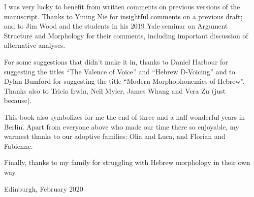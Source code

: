 I was very lucky to benefit from written comments on previous versions of the manuscript. Thanks to Yining Nie for insightful comments on a previous draft; and to Jim Wood and the students in his 2019 Yale seminar on Argument Structure and Morphology for their comments, including important discussion of alternative analyses.

For some suggestions that didn't make it in, thanks to Daniel Harbour for suggesting the titles ``The Valence of Voice'' and ``Hebrew D-Voicing'' and to Dylan Bumford for suggesting the title ``Modern Morphophonemics of Hebrew''. Thanks also to Tricia Irwin, Neil Myler, James Whang and Vera Zu (just because).

This book also symbolizes for me the end of three and a half wonderful years in Berlin. Apart from everyone above who made our time there so enjoyable, my warmest thanks to our adoptive families: Olia and Luca, and Florian and Fabienne.

Finally, thanks to my family for struggling with Hebrew morphology in their own way.

	\hfill Edinburgh, February 2020